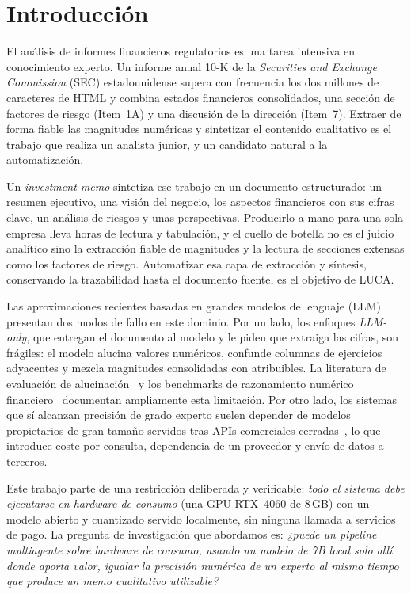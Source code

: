\documentclass[conference]{IEEEtran}
\begin{document}
\section{Introducción}
El análisis de informes financieros regulatorios es una tarea intensiva en
conocimiento experto. Un informe anual 10-K de la \textit{Securities and
Exchange Commission} (SEC) estadounidense supera con frecuencia los dos millones
de caracteres de HTML y combina estados financieros consolidados, una sección de
factores de riesgo (Item~1A) y una discusión de la dirección (Item~7). Extraer
de forma fiable las magnitudes numéricas y sintetizar el contenido cualitativo
es el trabajo que realiza un analista junior, y un candidato natural a la
automatización.

Un \textit{investment memo} sintetiza ese trabajo en un documento estructurado:
un resumen ejecutivo, una visión del negocio, los aspectos financieros con sus
cifras clave, un análisis de riesgos y unas perspectivas. Producirlo a mano para
una sola empresa lleva horas de lectura y tabulación, y el cuello de botella no es
el juicio analítico sino la extracción fiable de magnitudes y la lectura de
secciones extensas como los factores de riesgo. Automatizar esa capa de extracción
y síntesis, conservando la trazabilidad hasta el documento fuente, es el objetivo
de LUCA.

Las aproximaciones recientes basadas en grandes modelos de lenguaje (LLM)
presentan dos modos de fallo en este dominio. Por un lado, los enfoques
\emph{LLM-only}, que entregan el documento al modelo y le piden que extraiga las
cifras, son frágiles: el modelo alucina valores numéricos, confunde columnas de
ejercicios adyacentes y mezcla magnitudes consolidadas con atribuibles. La
literatura de evaluación de alucinación~\cite{ji2023hallucination} y los
benchmarks de razonamiento numérico financiero~\cite{chen2021finqa,zhu2021tatqa}
documentan ampliamente esta limitación. Por otro lado, los sistemas que sí
alcanzan precisión de grado experto suelen depender de modelos propietarios de
gran tamaño servidos tras APIs comerciales cerradas~\cite{wu2023bloomberggpt},
lo que introduce coste por consulta, dependencia de un proveedor y envío de
datos a terceros.

Este trabajo parte de una restricción deliberada y verificable: \emph{todo el
sistema debe ejecutarse en hardware de consumo} (una GPU RTX~4060 de 8\,GB) con
un modelo abierto y cuantizado servido localmente, sin ninguna llamada a
servicios de pago. La pregunta de investigación que abordamos es: \textit{¿puede
un pipeline multiagente sobre hardware de consumo, usando un modelo de 7B local
solo allí donde aporta valor, igualar la precisión numérica de un experto al
mismo tiempo que produce un memo cualitativo utilizable?}
\end{document}

